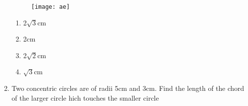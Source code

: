 \documentclass{article}
\begin{document}
\begin{enumerate}
		\begin{figure}[h]
			\centering
			\texttt{[image: ae]}
		\end{figure}
		\begin{enumerate}
			\item 2$\sqrt{3}$cm
			\item 2cm
			\item 2$\sqrt{2}$cm
			\item $\sqrt{3}$cm
		\end{enumerate}
	\item Two concentric circles are of radii 5cm and 3cm. Find the length of the chord of the larger circle hich touches the smaller circle



\end{enumerate}
\end{document}
